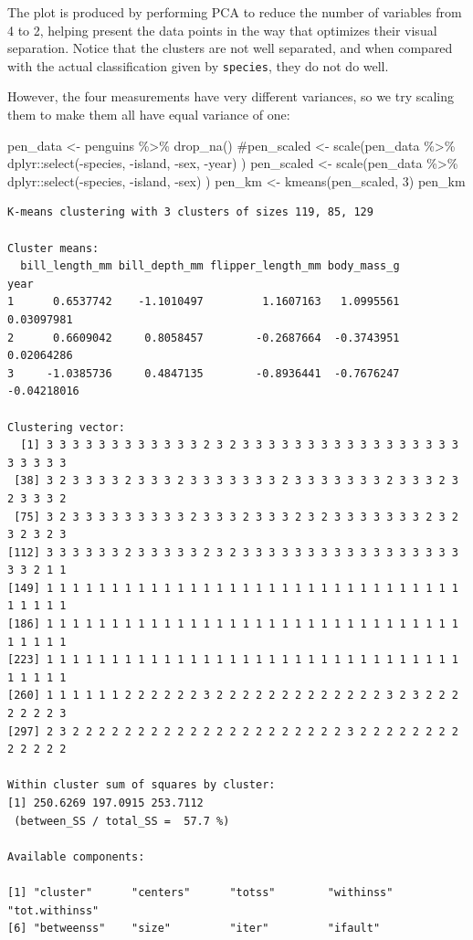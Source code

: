 \documentclass[
  letterpaper,
  DIV=11,
  numbers=noendperiod]{scrreprt}
\newenvironment{Shaded}{\begin{snugshade}}{\end{snugshade}}
\newcommand{\CommentTok}[1]{\textcolor[rgb]{0.37,0.37,0.37}{#1}}
\newcommand{\DecValTok}[1]{\textcolor[rgb]{0.68,0.00,0.00}{#1}}
\newcommand{\FunctionTok}[1]{\textcolor[rgb]{0.28,0.35,0.67}{#1}}
\newcommand{\NormalTok}[1]{\textcolor[rgb]{0.00,0.23,0.31}{#1}}
\newcommand{\OtherTok}[1]{\textcolor[rgb]{0.00,0.23,0.31}{#1}}
\newcommand{\SpecialCharTok}[1]{\textcolor[rgb]{0.37,0.37,0.37}{#1}}
\begin{document}
The plot is produced by performing PCA to reduce the number of variables
from 4 to 2, helping present the data points in the way that optimizes
their visual separation. Notice that the clusters are not well
separated, and when compared with the actual classification given by
\texttt{species}, they do not do well.

However, the four measurements have very different variances, so we try
scaling them to make them all have equal variance of one:

\begin{Shaded}
\begin{Highlighting}[]
\NormalTok{pen\_data }\OtherTok{\textless{}{-}}\NormalTok{ penguins }\SpecialCharTok{\%\textgreater{}\%} \FunctionTok{drop\_na}\NormalTok{()}
\CommentTok{\#pen\_scaled \textless{}{-} scale(pen\_data \%\textgreater{}\% dplyr::select({-}species, {-}island, {-}sex, {-}year) )}
\NormalTok{pen\_scaled }\OtherTok{\textless{}{-}} \FunctionTok{scale}\NormalTok{(pen\_data }\SpecialCharTok{\%\textgreater{}\%}\NormalTok{ dplyr}\SpecialCharTok{::}\FunctionTok{select}\NormalTok{(}\SpecialCharTok{{-}}\NormalTok{species, }\SpecialCharTok{{-}}\NormalTok{island, }\SpecialCharTok{{-}}\NormalTok{sex) )}
\NormalTok{pen\_km }\OtherTok{\textless{}{-}} \FunctionTok{kmeans}\NormalTok{(pen\_scaled, }\DecValTok{3}\NormalTok{)}
\NormalTok{pen\_km}
\end{Highlighting}
\end{Shaded}

\begin{verbatim}
K-means clustering with 3 clusters of sizes 119, 85, 129

Cluster means:
  bill_length_mm bill_depth_mm flipper_length_mm body_mass_g        year
1      0.6537742    -1.1010497         1.1607163   1.0995561  0.03097981
2      0.6609042     0.8058457        -0.2687664  -0.3743951  0.02064286
3     -1.0385736     0.4847135        -0.8936441  -0.7676247 -0.04218016

Clustering vector:
  [1] 3 3 3 3 3 3 3 3 3 3 3 3 2 3 2 3 3 3 3 3 3 3 3 3 3 3 3 3 3 3 3 3 3 3 3 3 3
 [38] 3 2 3 3 3 3 2 3 3 3 2 3 3 3 3 3 3 3 2 3 3 3 3 3 3 3 2 3 3 3 2 3 2 3 3 3 2
 [75] 3 2 3 3 3 3 3 3 3 3 3 2 3 3 3 2 3 3 3 2 3 2 3 3 3 3 3 3 3 2 3 2 3 2 3 2 3
[112] 3 3 3 3 3 3 2 3 3 3 3 3 2 3 2 3 3 3 3 3 3 3 3 3 3 3 3 3 3 3 3 3 3 3 2 1 1
[149] 1 1 1 1 1 1 1 1 1 1 1 1 1 1 1 1 1 1 1 1 1 1 1 1 1 1 1 1 1 1 1 1 1 1 1 1 1
[186] 1 1 1 1 1 1 1 1 1 1 1 1 1 1 1 1 1 1 1 1 1 1 1 1 1 1 1 1 1 1 1 1 1 1 1 1 1
[223] 1 1 1 1 1 1 1 1 1 1 1 1 1 1 1 1 1 1 1 1 1 1 1 1 1 1 1 1 1 1 1 1 1 1 1 1 1
[260] 1 1 1 1 1 1 2 2 2 2 2 2 3 2 2 2 2 2 2 2 2 2 2 2 2 2 3 2 3 2 2 2 2 2 2 2 3
[297] 2 3 2 2 2 2 2 2 2 2 2 2 2 2 2 2 2 2 2 2 2 2 2 3 2 2 2 2 2 2 2 2 2 2 2 2 2

Within cluster sum of squares by cluster:
[1] 250.6269 197.0915 253.7112
 (between_SS / total_SS =  57.7 %)

Available components:

[1] "cluster"      "centers"      "totss"        "withinss"     "tot.withinss"
[6] "betweenss"    "size"         "iter"         "ifault"      
\end{verbatim}
\end{document}
